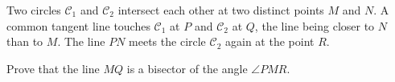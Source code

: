 \documentclass[varwidth]{standalone}
\begin{document}
    Two circles $\mathcal{C}_1$ and $\mathcal{C}_2$ intersect each other at two distinct points $M$ and $N$. A common tangent line touches $\mathcal{C}_1$ at $P$ and $\mathcal{C}_2$ at $Q$, the line being closer to $N$ than to $M$. The line $PN$ meets the circle $\mathcal{C}_2$ again at the point $R$.

    Prove that the line $MQ$ is a bisector of the angle $\angle PMR$.
\end{document}
